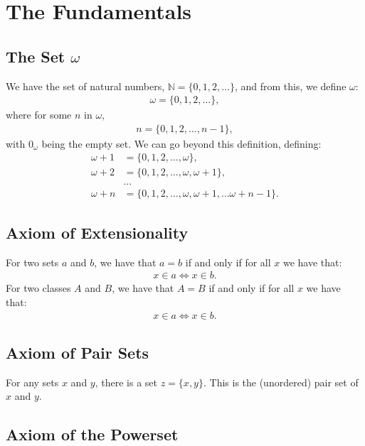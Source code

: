 \section{The Fundamentals}

\subsection{The Set $\omega$}

We have the set of natural numbers, $\mathbb{N} = \{0, 1, 2, \ldots\}$,
and from this, we define $\omega$: \begin{align*}
    \omega = \{0, 1, 2, \ldots\},
\end{align*} where for some $n$ in $\omega$, \begin{align*}
    n = \{0, 1, 2, \ldots, n - 1\},
\end{align*} with $0_\omega$ being the empty set. We can go beyond this
definition, defining: \begin{align*}
    \omega + 1 &= \{0, 1, 2, \ldots, \omega\}, \\
    \omega + 2 &= \{0, 1, 2, \ldots, \omega, \omega + 1\}, \\
    &\ldots \\
    \omega + n &= \{0, 1, 2, \ldots, \omega, \omega + 1, \ldots \omega + n - 1\}.
\end{align*}

\subsection{Axiom of Extensionality}

For two sets $a$ and $b$, we have that $a = b$ if and only if for all
$x$ we have that: \begin{align*}
    x \in a \Longleftrightarrow x \in b.
\end{align*} 
For two classes $A$ and $B$, we have that $A = B$ if and only if for all
$x$ we have that: \begin{align*}
    x \in a \Longleftrightarrow x \in b.
\end{align*}

\subsection{Axiom of Pair Sets}

For any sets $x$ and $y$, there is a set $z = \{x, y\}$. This is the
(unordered) pair set of $x$ and $y$.

\subsection{Axiom of the Powerset}

